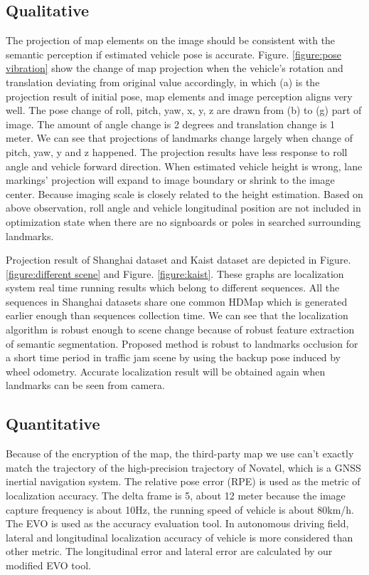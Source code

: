 \documentclass[letterpaper, 10 pt, conference]{ieeeconf}
\begin{document}
\subsection{Qualitative}
The projection of map elements on the image should be consistent with the semantic perception if estimated vehicle pose is accurate. Figure. \ref{figure:pose vibration} show the change of map projection when the vehicle's rotation and translation deviating from original value accordingly, in which (a) is the projection result of initial pose, map elements and image perception aligns very well. The pose change of roll, pitch, yaw, x, y, z are drawn from (b) to (g) part of image. The amount of angle change is 2 degrees and translation change is 1 meter. We can see that projections of landmarks change largely when change of pitch, yaw, y and z happened. The projection results have less response to roll angle and vehicle forward direction. When estimated vehicle height is wrong, lane markings' projection will expand to image boundary or shrink to the image center. Because imaging scale is closely related to the height estimation. Based on above observation, roll angle and vehicle longitudinal position are not included in optimization state when there are no signboards or poles in searched surrounding landmarks.

Projection result of Shanghai dataset and Kaist dataset are depicted in Figure. \ref{figure:different scene} and Figure. \ref{figure:kaist}. These graphs are localization system real time running results which belong to different sequences. All the sequences in Shanghai datasets share one common HDMap which is generated earlier enough than sequences collection time. We can see that the localization algorithm is robust enough to scene change because of robust feature extraction of semantic segmentation. Proposed method is robust to landmarks occlusion for a short time period in traffic jam scene by using the backup pose induced by wheel odometry. Accurate localization result will be obtained again when landmarks can be seen from camera.

\subsection{Quantitative}
Because of the encryption of the map, the third-party map we use can't exactly match the trajectory of the high-precision trajectory of Novatel, which is a GNSS inertial navigation system. The relative pose error (RPE) is used as the metric of localization accuracy. The delta frame is 5, about 12 meter because the image capture frequency is about 10Hz, the running speed of vehicle is about 80km/h. The EVO \cite{grupp2017evo} is used as the accuracy evaluation tool. In autonomous driving field, lateral and longitudinal localization accuracy of vehicle is more considered than other metric. The longitudinal error and lateral error are calculated by our modified EVO tool.
\end{document}
